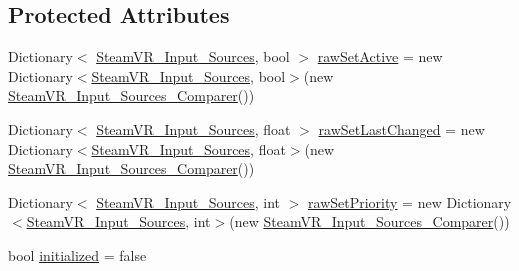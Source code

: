 \subsection*{Protected Attributes}
\begin{DoxyCompactItemize}
\item 
Dictionary$<$ \mbox{\hyperlink{namespace_valve_1_1_v_r_a82e5bf501cc3aa155444ee3f0662853f}{Steam\+V\+R\+\_\+\+Input\+\_\+\+Sources}}, bool $>$ \mbox{\hyperlink{class_valve_1_1_v_r_1_1_steam_v_r___action_set___data_ac472dc40ce5ea1b5b57f9f8297623ac2}{raw\+Set\+Active}} = new Dictionary$<$\mbox{\hyperlink{namespace_valve_1_1_v_r_a82e5bf501cc3aa155444ee3f0662853f}{Steam\+V\+R\+\_\+\+Input\+\_\+\+Sources}}, bool$>$(new \mbox{\hyperlink{struct_valve_1_1_v_r_1_1_steam_v_r___input___sources___comparer}{Steam\+V\+R\+\_\+\+Input\+\_\+\+Sources\+\_\+\+Comparer}}())
\item 
Dictionary$<$ \mbox{\hyperlink{namespace_valve_1_1_v_r_a82e5bf501cc3aa155444ee3f0662853f}{Steam\+V\+R\+\_\+\+Input\+\_\+\+Sources}}, float $>$ \mbox{\hyperlink{class_valve_1_1_v_r_1_1_steam_v_r___action_set___data_a86b35b411ada16bc16d9473b617bb19b}{raw\+Set\+Last\+Changed}} = new Dictionary$<$\mbox{\hyperlink{namespace_valve_1_1_v_r_a82e5bf501cc3aa155444ee3f0662853f}{Steam\+V\+R\+\_\+\+Input\+\_\+\+Sources}}, float$>$(new \mbox{\hyperlink{struct_valve_1_1_v_r_1_1_steam_v_r___input___sources___comparer}{Steam\+V\+R\+\_\+\+Input\+\_\+\+Sources\+\_\+\+Comparer}}())
\item 
Dictionary$<$ \mbox{\hyperlink{namespace_valve_1_1_v_r_a82e5bf501cc3aa155444ee3f0662853f}{Steam\+V\+R\+\_\+\+Input\+\_\+\+Sources}}, int $>$ \mbox{\hyperlink{class_valve_1_1_v_r_1_1_steam_v_r___action_set___data_abcd0319e66f185136fb2be11959d4dc0}{raw\+Set\+Priority}} = new Dictionary$<$\mbox{\hyperlink{namespace_valve_1_1_v_r_a82e5bf501cc3aa155444ee3f0662853f}{Steam\+V\+R\+\_\+\+Input\+\_\+\+Sources}}, int$>$(new \mbox{\hyperlink{struct_valve_1_1_v_r_1_1_steam_v_r___input___sources___comparer}{Steam\+V\+R\+\_\+\+Input\+\_\+\+Sources\+\_\+\+Comparer}}())
\item 
bool \mbox{\hyperlink{class_valve_1_1_v_r_1_1_steam_v_r___action_set___data_a8ed7a27af3d170ad74d3904278da4a9e}{initialized}} = false
\end{DoxyCompactItemize}
